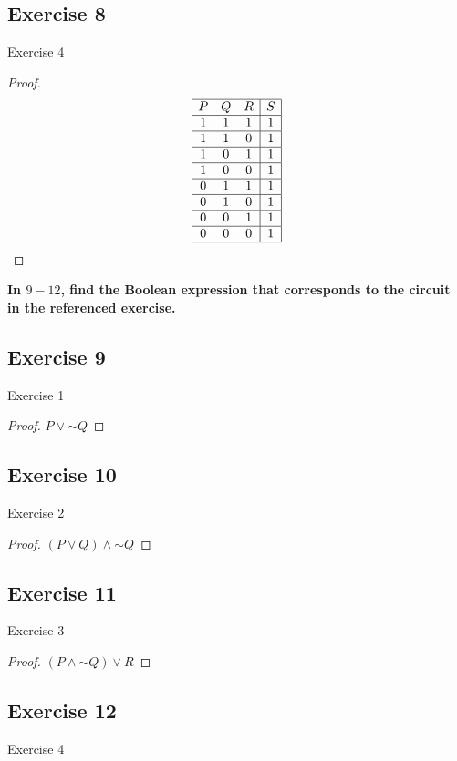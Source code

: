 \documentclass[14pt]{extarticle}
\begin{document}
\subsection{Exercise 8}
Exercise 4

\begin{proof}
$$
\begin{array}{|ccc|c|}
\hline
P&Q&R&S\\
\hline
1&1&1&1\\
\hline
1&1&0&1\\
\hline
1&0&1&1\\
\hline
1&0&0&1\\
\hline
0&1&1&1\\
\hline
0&1&0&1\\
\hline
0&0&1&1\\
\hline
0&0&0&1\\
\hline
\end{array}
$$
\end{proof}

{\bf \color{cyan} In $9-12$, find the Boolean expression that corresponds to the circuit in the referenced exercise.}

\subsection{Exercise 9}
Exercise 1

\begin{proof}
$P \vee {\sim Q}$
\end{proof}

\subsection{Exercise 10}
Exercise 2

\begin{proof}
$(P \vee Q) \wedge {\sim Q}$
\end{proof}

\subsection{Exercise 11}
Exercise 3

\begin{proof}
$(P \wedge {\sim Q}) \vee R$
\end{proof}

\subsection{Exercise 12}
Exercise 4
\end{document}
